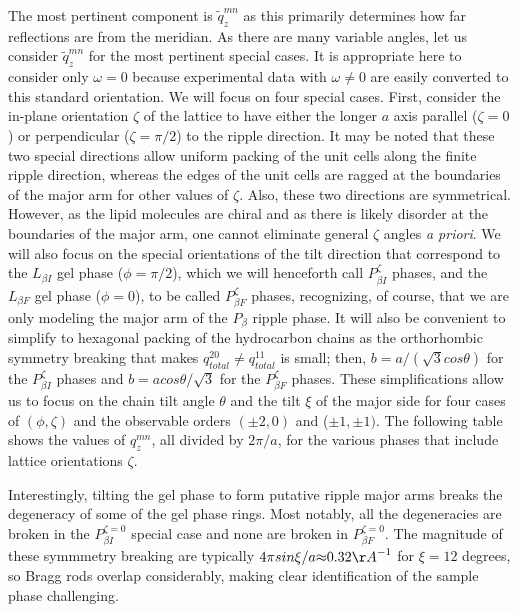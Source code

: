 \documentclass[
 preprint,
 showkeys, 
 amsmath,
 amssymb,
 aps,
]{revtex4-1}
\begin{document}
The most pertinent component is $\tilde{q}_z^{mn}$ as this primarily determines how far reflections are from the meridian.  As there are many variable angles, let us consider $\tilde{q}_z^{mn}$ for the most pertinent special cases.  It is appropriate here to consider only $\omega=0$ because experimental data with $\omega{\neq}0$ are easily converted to this standard orientation.  We will focus on four special cases.  First, consider the in-plane orientation ${\zeta}$ of the lattice to have either the longer $a$ axis parallel (${\zeta}=0$) or perpendicular (${\zeta}={\pi}/2$) to the ripple direction.  It may be noted that these two special directions allow uniform packing of the unit cells along the finite ripple direction, whereas the edges of the unit cells are ragged at the boundaries of the major arm for other values of ${\zeta}$.  Also, these two directions are symmetrical.  However, as the lipid molecules are chiral and as there is likely disorder at the boundaries of the major arm, one cannot eliminate general ${\zeta}$ angles {\it a priori}.  We will also focus on the special orientations of the tilt direction that correspond to the $L_{{\beta}I}$ gel phase ($\phi=\pi/2$), which we will henceforth call $P_{{\beta}I}^{\zeta}$ phases, and the $L_{{\beta}F}$ gel phase ($\phi=0$), to be called $P_{{\beta}F}^{\zeta}$ phases, recognizing, of course, that we are only modeling the major arm of the $P_{\beta}$ ripple phase.   It will also be convenient to simplify to hexagonal packing of the hydrocarbon chains as the orthorhombic symmetry breaking that makes $q_{total}^{20}{\neq}q_{total}^{11}$ is small; then, $b=a/(\sqrt{3}cos{\theta})$ for the $P_{{\beta}I}^{\zeta}$ phases and $b=acos{\theta}/\sqrt{3}$ for the $P_{{\beta}F}^{\zeta}$ phases.  These simplifications allow us to focus on the chain tilt angle $\theta$ and the tilt $\xi$ of the major side for four cases of $(\phi,\zeta)$ and the observable orders $({\pm}2,0)$ and (${\pm}1,{\pm}1)$.  The following table shows the values of $q_z^{mn}$, all divided by $2\pi/a$, for the various phases that include lattice orientations $\zeta$.  

Interestingly, tilting the gel phase to form putative ripple major arms breaks the degeneracy of some of the gel phase rings.  Most notably, all the degeneracies are broken in the $P_{{\beta}I}^{\zeta=0}$ special case and none are broken in $P_{{\beta}F}^{\zeta=0}$.  The magnitude of these symmmetry breaking are typically $4{\pi}sin{\xi}/a {\approx} 0.32 {\AA}^{-1}$  for $\xi=12$ degrees, so Bragg rods overlap considerably, making clear identification of the sample phase challenging.
\vspace{0.5cm}
\end{document}
